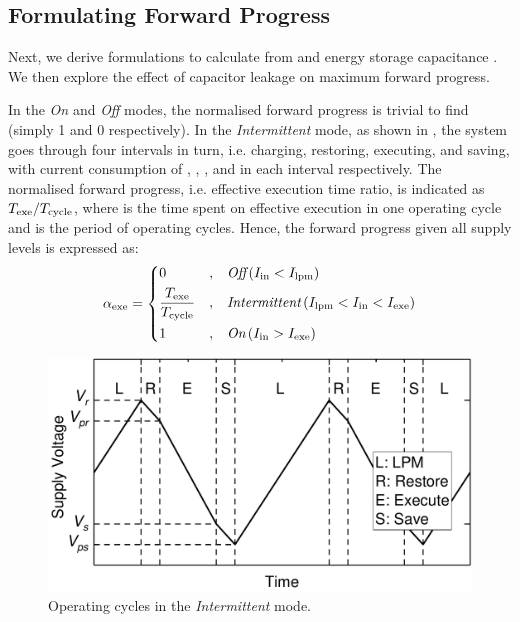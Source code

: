\subsection{Formulating Forward Progress} \label{subsec:formulation}

Next, we derive formulations to calculate  from  and energy storage capacitance . We then explore the effect of capacitor leakage on maximum forward progress. 

In the \textit{On} and \textit{Off} modes, the normalised forward progress is trivial to find (simply 1 and 0 respectively). In the \textit{Intermittent} mode,  as shown in , the system goes through four intervals in turn, i.e. charging, restoring, executing, and saving, with current consumption of , , , and  in each interval respectively. The normalised forward progress, i.e. effective execution time ratio, is indicated as $T_{\text{exe}} / T_{\text{cycle}}$, where  is the time spent on effective execution in one operating cycle and  is the period of operating cycles. Hence, the forward progress given all supply levels is expressed as:
\begin{equation}
    \alpha_{\text{exe}} = \left\{
    \begin{aligned}
        & 0 & , & \quad \textit{Off} \, (I_{\text{in}} < I_{\text{lpm}}) \\
        & \frac{T_{\text{exe}}}{T_{\text{cycle}}} & , & \quad \textit{Intermittent} \, (I_{\text{lpm}} < I_{\text{in}} < I_{\text{exe}}) \\
        & 1 & , & \quad \textit{On} \, (I_{\text{in}} > I_{\text{exe}})
    \end{aligned}
    \right.
    \label{eq:feff}
\end{equation}

\begin{figure}[!t]
    \centering
    \includegraphics[width=0.9\columnwidth]{ch3_sizingeffect/figures/CRESdemoFig}
    \caption{Operating cycles in the \textit{Intermittent} mode. }
    \label{fig:operatingCycle}
\end{figure}

